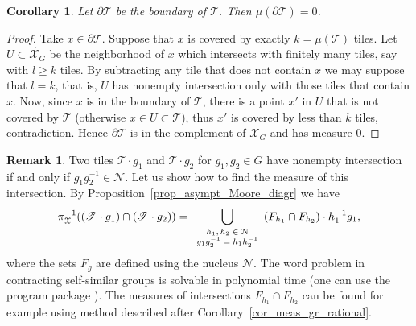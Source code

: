 \documentclass[12pt]{article}
\newcommand{\limGs}[1][G]{\mathcal{X}_{#1}}
\newcommand{\tile}{\mathscr{T}}
\newcommand{\nucl}{\mathcal{N}}
\newtheorem{cor}[theor]{Corollary}
\theoremstyle{definition}
\newtheorem{remark}{Remark}
\begin{document}
\begin{cor}
Let $\partial\tile$ be the boundary of $\tile$. Then $\mu(\partial\tile)=0$.
\end{cor}
\begin{proof}
Take $x\in\partial\tile$. Suppose that $x$ is covered by exactly $k=\mu(\tile)$ tiles. Let
$U\subset\dot{\limGs}$ be the neighborhood of $x$ which intersects with finitely many tiles, say
with $l\geq k$ tiles. By subtracting any tile that does not contain $x$ we may suppose that $l=k$,
that is, $U$ has nonempty intersection only with those tiles that contain $x$. Now, since $x$ is in
the boundary of $\tile$, there is a point $x'$ in $U$ that is not covered by $\tile$ (otherwise
$x\in U\subset\tile$), thus $x'$ is covered by less than $k$ tiles, contradiction. Hence
$\partial\tile$ is in the complement of $\dot{\limGs}$ and has measure $0$.
\end{proof}




\begin{remark}\label{rem_meas_inters_tiles}
Two tiles $\tile\cdot g_1$ and $\tile\cdot g_2$ for $g_1,g_2\in G$ have nonempty intersection if
and only if $g_1g_2^{-1}\in\nucl$. Let us show how to find the measure of this intersection. By
Proposition~\ref{prop_asympt_Moore_diagr} we have
\begin{eqnarray*}
\pi^{-1}_{\limGs[]}((\tile\cdot g_1)\cap (\tile\cdot g_2))=\bigcup_{{\scriptsize\begin{array}{c}
                              h_1,h_2\in\nucl \\
                              g_1g_2^{-1}=h_1h_2^{-1}
                            \end{array}}}
(F_{h_1}\cap F_{h_2})\cdot h_1^{-1}g_1,
\end{eqnarray*}
where the sets $F_g$ are defined using the nucleus $\nucl$. The word problem in contracting
self-similar groups is solvable in polynomial time \cite[Proposition~2.13.10]{self_sim_groups} (one
can use the program package \cite{AutomGrp}). The measures of intersections $F_{h_1}\cap F_{h_2}$
can be found for example using method described after Corollary~\ref{cor_meas_gr_rational}.
\end{remark}
\end{document}
